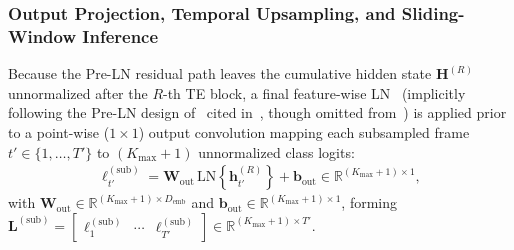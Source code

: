 \documentclass[lettersize,journal]{IEEEtran}
\begin{document}
\subsubsection{Output Projection, Temporal Upsampling, and Sliding-Window Inference}
\label{sec:output_stage}
Because the Pre-\gls{LN} residual path leaves the cumulative hidden state $\mathbf{H}^{(R)}$ unnormalized after the $R$-th \gls{TE} block, a final feature-wise \gls{LN}~\cite{nguyen2019transformers} (implicitly following the Pre-\gls{LN} design of~\cite{nguyen2019transformers} cited in~\cite{cornell2022overlapped}, though omitted from~\cite[Fig.~2]{cornell2022overlapped}) is applied prior to a point-wise ($1 \times 1$) output convolution mapping each subsampled frame $t' \in \{1, \dots, T'\}$ to $(K_{\mathrm{max}} + 1)$ unnormalized class logits:
\begin{align}
  \bm{\ell}_{t'}^{(\mathrm{sub})} = \mathbf{W}_{\mathrm{out}} \, \mathrm{LN}\!\left\{\mathbf{h}_{t'}^{(R)}\right\} + \mathbf{b}_{\mathrm{out}} \in \mathbb{R}^{(K_{\mathrm{max}} + 1) \times 1},
  \label{eq:output_conv}
\end{align}
with $\mathbf{W}_{\mathrm{out}} \in \mathbb{R}^{(K_{\mathrm{max}} + 1) \times D_{\mathrm{emb}}}$ and $\mathbf{b}_{\mathrm{out}} \in \mathbb{R}^{(K_{\mathrm{max}} + 1) \times 1}$, forming $\mathbf{L}^{(\mathrm{sub})} = \begin{bmatrix} \bm{\ell}_1^{(\mathrm{sub})} & \cdots & \bm{\ell}_{T'}^{(\mathrm{sub})} \end{bmatrix} \in \mathbb{R}^{(K_{\mathrm{max}} + 1) \times T'}$.
\end{document}
